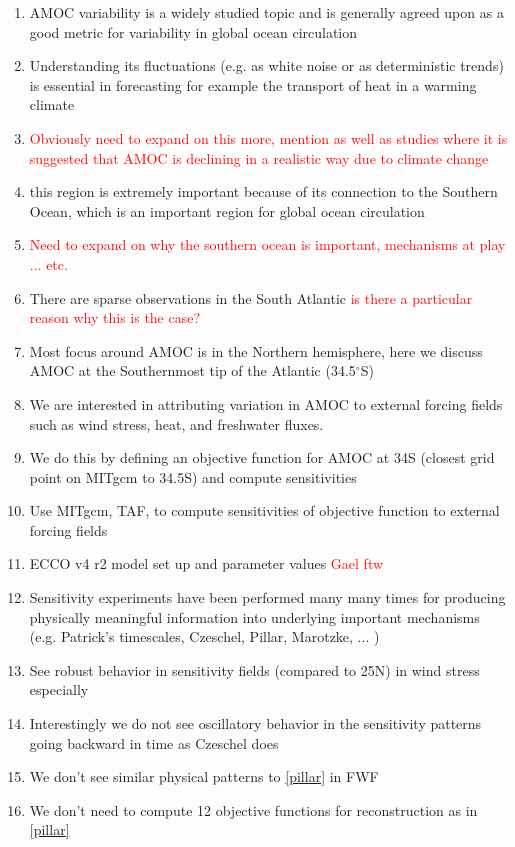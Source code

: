 \documentclass[a4paper,11pt]{article}
\newcommand{\red}[1]{\textcolor{red}{#1}}
\begin{document}
	\begin{enumerate} 

	  \item AMOC variability is a widely studied topic and is generally agreed upon as a good metric for variability in global ocean circulation 
	  \item Understanding its fluctuations (e.g. as white noise or as deterministic trends) is essential in forecasting for example the transport of heat in a warming climate
	  \item \red{Obviously need to expand on this more, mention \cite{wunschAndHeimbach_AMOC} as well as studies where it is suggested that AMOC is declining in a realistic way due to climate change} 
	  \item this region is extremely important because of its connection to the Southern Ocean, which is an important region for global ocean circulation 
	  \item \red{Need to expand on why the southern ocean is important, mechanisms at play ... etc.}
	  \item There are sparse observations in the South Atlantic \red{is there a particular reason why this is the case?}
	  \item Most focus around AMOC is in the Northern hemisphere, here we discuss AMOC at the Southernmost tip of the Atlantic (34.5$^{\circ}$S)
	  \item We are interested in attributing variation in AMOC to external forcing fields such as wind stress, heat, and freshwater fluxes.
	  \item We do this by defining an objective function for AMOC at 34S (closest grid point on MITgcm to 34.5S) and compute sensitivities 
	  \item Use MITgcm, TAF, to compute sensitivities of objective function to external forcing fields
	  \item ECCO v4 r2 model set up and parameter values \red{Gael ftw}
	  \item Sensitivity experiments have been performed many many times for producing physically meaningful information into underlying important mechanisms (e.g. Patrick's timescales, Czeschel, Pillar, Marotzke, ... )
	  \item See robust behavior in sensitivity fields (compared to 25N) in wind stress especially 
	  \item Interestingly we do not see oscillatory behavior in the sensitivity patterns going backward in time as Czeschel does
	  \item We don't see similar physical patterns to \ref{pillar} in FWF
	  \item We don't need to compute 12 objective functions for reconstruction as in \ref{pillar}
 
	\end{enumerate} 
\end{document}
